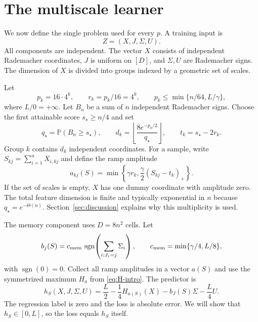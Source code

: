 \documentclass{article}
\newcommand{\Pp}{\mathbb P}
\newcommand{\1}{\mathbf 1}
\newcommand{\sgn}{\operatorname{sgn}}
\begin{document}
\section{The multiscale learner}

We now define the single problem used for every $p$. A training input is \[ Z=(X,J,\Sigma,U). \] All components are independent. The vector $X$ consists of independent Rademacher coordinates, $J$ is uniform on $[D]$, and $\Sigma,U$ are Rademacher signs. The dimension of $X$ is divided into groups indexed by a geometric set of scales.

Let
\begin{equation}
 p_k=16\cdot4^k,
 \qquad r_k=p_k/16=4^k,
 \qquad
 p_k\le \min\{n/64,L/\gamma\},
 \label{eq:scales}
\end{equation}
where $L/0=+\infty$. Let $B_n$ be a sum of $n$ independent Rademacher signs. Choose the first attainable score $s_\star\ge n/4$ and set
\begin{equation}
 q_\star=\Pp(B_n\ge s_\star),
 \qquad
 d_k=\left\lfloor\frac{8e^{-p_k/2}}{q_\star}\right\rfloor,
 \qquad
 t_k=s_\star-2r_k.
 \label{eq:dimensions}
\end{equation}
Group $k$ contains $d_k$ independent coordinates. For a sample, write $S_{kj}=\sum_{i=1}^nX_{i,kj}$ and define the ramp amplitude
\begin{equation}
 a_{kj}(S)=\min\left\{\gamma r_k,
 \frac{\gamma}{2}(S_{kj}-t_k)_+\right\}.
 \label{eq:ramp}
\end{equation}
If the set of scales is empty, $X$ has one dummy coordinate with amplitude zero. The total feature dimension is finite and typically exponential in $n$ because $q_\star=e^{-\Theta(n)}$. Section~\ref{sec:discussion} explains why this multiplicity is used.

The memory component uses $D=8n^2$ cells. Let
\begin{equation}
 b_j(S)=c_{\rm mem}\,
 \sgn\!\left(\sum_{i:J_i=j}\Sigma_i\right),
 \qquad
 c_{\rm mem}=\min\{\gamma/4,L/8\},
 \label{eq:memory}
\end{equation}
with $\sgn(0)=0$. Collect all ramp amplitudes in a vector $a(S)$ and use the symmetrized maximum $H_a$ from \eqref{eq:H-intro}. The predictor is
\begin{equation}
 h_S(X,J,\Sigma,U)
 =\frac L2-\frac14H_{a(S)}(X)-b_J(S)\Sigma-\frac L4U.
 \label{eq:predictor}
\end{equation}
The regression label is zero and the loss is absolute error. We will show that $h_S\in[0,L]$, so the loss equals $h_S$ itself.
\end{document}
